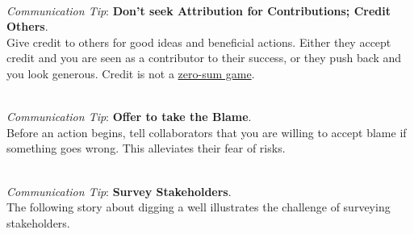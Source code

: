 \ \\
\textit{Communication Tip}: \textbf{Don't seek Attribution for Contributions; Credit Others\label{sec:credit-others}}.\\
Give credit to others for good ideas and beneficial actions. Either they accept credit and you are seen as a contributor to their success, or they push back and you look generous. Credit is not a \href{https://en.wikipedia.org/wiki/Zero-sum_game}{zero-sum game}.

\ \\
\textit{Communication Tip}: \textbf{Offer to take the Blame\label{sec:take-blame}}.\\
Before an action begins, tell collaborators that you are willing to accept blame if something goes wrong. This alleviates their fear of risks.

\ \\
\textit{Communication Tip}: \textbf{Survey Stakeholders}.\\
The following story about digging a well illustrates the challenge of surveying stakeholders. 


